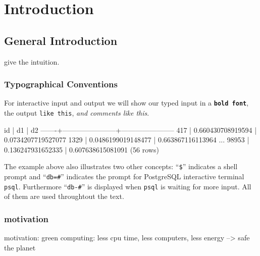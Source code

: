 \chapter{Introduction}
\label{chap:Introduction}


\section{General Introduction}

give the intuition.

\subsection{Typographical Conventions}
For interactive input and output we will show our typed input in a \texttt{\bfseries bold font}, the output \texttt{like this}, \textit{and comments like this}.



\begin{interactive}
  id   |          d1           |          d2
-------+-----------------------+-----------------------
   417 |     0.660430708919594 |    0.0734207719527077
  1329 |    0.0486199019148477 |     0.663867116113964
...
 98953 |     0.136247931652335 |     0.607638615081091
(56 rows)

\shprompt{}
\end{interactive}

The example above also illustrates two other concepts: ``\texttt{\$}''
indicates a shell prompt and ``\texttt{db=\#}'' indicates the prompt for
PostgreSQL interactive terminal \texttt{psql}. Furthermore
``\texttt{db-\#}'' is displayed when \texttt{psql} is waiting for more
input. All of them are used throughtout the text.

\subsection{motivation}
motivation: green computing: less cpu time, less computers, less
energy --> safe the planet

